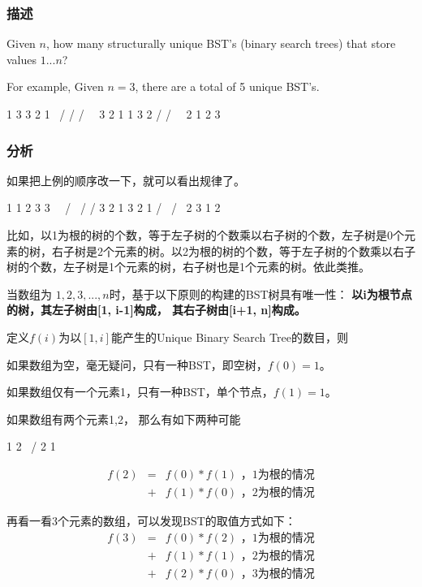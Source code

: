 \subsubsection{描述}
Given $n$, how many structurally unique BST's (binary search trees) that store values $1...n$?

For example,
Given $n = 3$, there are a total of 5 unique BST's.
\begin{Code}
   1         3     3      2      1
    \       /     /      / \      \
     3     2     1      1   3      2
    /     /       \                 \
   2     1         2                 3
\end{Code}

\subsubsection{分析}
如果把上例的顺序改一下，就可以看出规律了。
\begin{Code}
 1       1           2          3       3
  \       \         / \        /       / 
   3       2       1   3      2       1
  /         \                /         \
2            3              1           2
\end{Code}

比如，以1为根的树的个数，等于左子树的个数乘以右子树的个数，左子树是0个元素的树，右子树是2个元素的树。以2为根的树的个数，等于左子树的个数乘以右子树的个数，左子树是1个元素的树，右子树也是1个元素的树。依此类推。

当数组为 $1,2,3,...,n$时，基于以下原则的构建的BST树具有唯一性：
\textbf{以i为根节点的树，其左子树由[1, i-1]构成， 其右子树由[i+1, n]构成。}

定义$f(i)$为以$[1,i]$能产生的Unique Binary Search Tree的数目，则

如果数组为空，毫无疑问，只有一种BST，即空树，$f(0)=1$。

如果数组仅有一个元素{1}，只有一种BST，单个节点，$f(1)=1$。

如果数组有两个元素{1,2}， 那么有如下两种可能
\begin{Code}
1             2
  \          /
    2      1
\end{Code}

\begin{eqnarray}
f(2) &=& f(0) * f(1)   \text{ ，1为根的情况} \nonumber \\
     &+& f(1) * f(0)   \text{ ，2为根的情况} \nonumber
\end{eqnarray}

再看一看3个元素的数组，可以发现BST的取值方式如下：
\begin{eqnarray}
f(3) &=& f(0) * f(2)   \text{ ，1为根的情况} \nonumber \\
     &+& f(1) * f(1)   \text{ ，2为根的情况} \nonumber \\
     &+& f(2) * f(0)   \text{ ，3为根的情况} \nonumber
\end{eqnarray}

